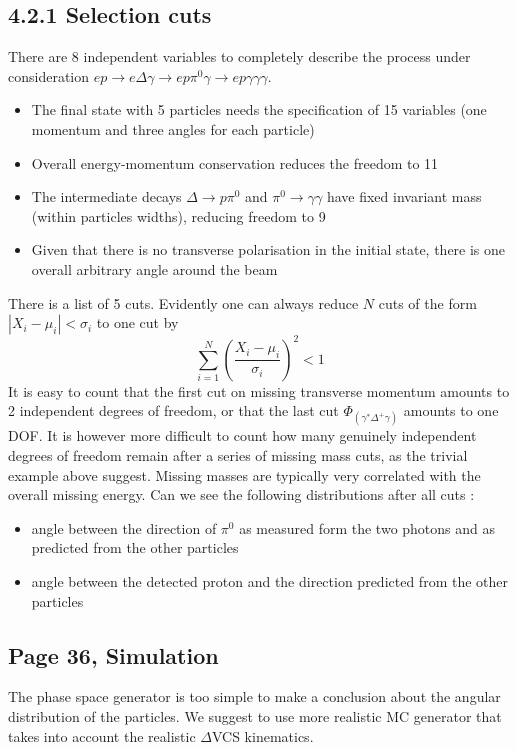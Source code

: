 \documentclass[11pt]{paper}
\begin{document}
\subsection*{4.2.1 Selection cuts}
There are 8 independent variables to completely describe the process under consideration $ep\rightarrow e\Delta\gamma\rightarrow ep\pi^0\gamma\rightarrow ep\gamma\gamma\gamma$.
\begin{itemize}
\item The final state with 5 particles needs the specification of 15 variables (one momentum and three angles for each particle)
\item Overall energy-momentum conservation reduces the freedom to 11
\item The intermediate decays $\Delta\rightarrow p\pi^0$ and $\pi^0\rightarrow\gamma\gamma$ have fixed invariant mass (within particles widths), reducing freedom to 9
\item Given that there is no transverse polarisation in the initial state, there is one overall arbitrary angle around the beam
\end{itemize}
There is a list of 5 cuts. Evidently one can always reduce $N$ cuts of the form $|X_i-\mu_i|<\sigma_i$ to one cut by 
$$\sum_{i=1}^N\left(\frac{X_i-\mu_i}{\sigma_i}\right)^2<1$$
It is easy to count that the first cut on missing transverse momentum amounts to 2 independent degrees of freedom, or that the last cut $\Phi_{(\gamma^*\Delta^+\gamma)}$ amounts to one DOF.
It is however more difficult to count how many genuinely independent degrees of freedom remain after a series of missing mass cuts, as the trivial example above suggest.
Missing masses are typically very correlated with the overall missing energy.
Can we see the following distributions after all cuts :
\begin{itemize}
\item angle between the direction of $\pi^0$ as measured form the two photons and as predicted from the other particles
\item angle between the detected proton and the direction predicted from the other particles
\end{itemize}

\subsection*{Page 36, Simulation} The phase space generator is too simple to make a conclusion about the angular distribution of the particles. 
We suggest to use more realistic MC generator that takes into account the realistic $\Delta$VCS kinematics.
\end{document}
